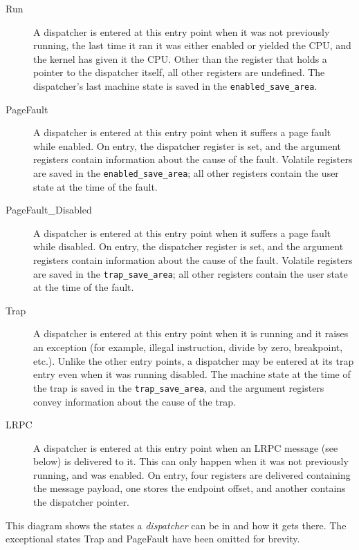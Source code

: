\documentclass[a4paper,11pt,twoside]{report}
\begin{document}
\begin{description}
\item[Run] A dispatcher is entered at this entry point when it was
not previously running, the last time it ran it was either enabled or
yielded the CPU, and the kernel has given it the CPU. Other than the
register that holds a pointer to the dispatcher itself, all other registers
are undefined. The dispatcher's last machine state is saved in the
\lstinline+enabled_save_area+.

\item[PageFault] A dispatcher is entered at this entry point when it
suffers a page fault while enabled. On entry, the dispatcher register is
set, and the argument registers contain information about the cause of
the fault. Volatile registers are saved in the
\lstinline+enabled_save_area+; all other registers contain the user
state at the time of the fault.

\item[PageFault\_Disabled] A dispatcher is entered at this entry point when it
suffers a page fault while disabled. On entry, the dispatcher register is
set, and the argument registers contain information about the cause of
the fault. Volatile registers are saved in the
\lstinline+trap_save_area+; all other registers contain the user
state at the time of the fault.

\item[Trap] A dispatcher is entered at this entry point when it is
running and it raises an exception (for example, illegal
instruction, divide by zero, breakpoint, etc.). Unlike the other
entry points, a dispatcher may be entered at its trap entry even
when it was running disabled. The machine state at the time of the
trap is saved in the \lstinline+trap_save_area+, and the argument
registers convey information about the cause of the trap.

\item[LRPC] A dispatcher is entered at this entry point when an
LRPC message (see below) is delivered to it. This can only
happen when it was not previously running, and was enabled. On
entry, four registers are delivered containing the message payload,
one stores the endpoint offset, and another contains the dispatcher pointer.
\end{description}

This diagram shows the states a \emph{dispatcher} can be in and how it
gets there. The exceptional states Trap and PageFault have been
omitted for brevity.
\end{document}
